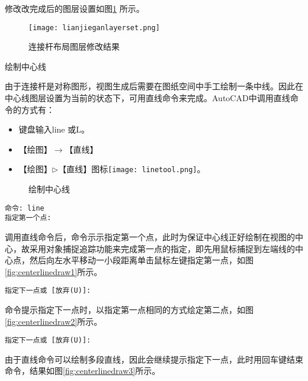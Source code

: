 \begin{procedure}
修改改完成后的图层设置如图\ref{fig:lianjieganlayerset} 所示。
\begin{figure}[htbp]
\centering
\texttt{[image: lianjieganlayerset.png]}
\caption{连接杆布局图层修改结果}\label{fig:lianjieganlayerset}
\end{figure}
\item 绘制中心线

由于连接杆是对称图形，视图生成后需要在图纸空间中手工绘制一条中线。因此在中心线图层设置为当前的状态下，可用直线命令来完成。AutoCAD中调用直线命令的方式有：
\begin{itemize}
\item 键盘输入line 或L。
\item 【绘图】$\rightarrow$【直线】
\item 【绘图】$\triangleright$【直线】图标\texttt{[image: linetool.png]}。
\end{itemize}

\begin{figure}[htbp]
\centering
{}\hspace{20pt}
\hspace{20pt}
\caption{绘制中心线}
\end{figure}

\begin{lstlisting}
命令: line
指定第一个点:
\end{lstlisting}

调用直线命令后，命令示示指定第一个点，此时为保证中心线正好绘制在视图的中心，故采用对象捕捉追踪功能来完成第一点的指定，即先用鼠标捕捉到左端线的中心点，然后向左水平移动一小段距离单击鼠标左键指定第一点，如图\ref{fig:centerlinedraw1}所示。
\begin{lstlisting}
指定下一点或 [放弃(U)]:
\end{lstlisting}

命令提示指定下一点时，以指定第一点相同的方式绘定第二点，如图\ref{fig:centerlinedraw2}所示。
\begin{lstlisting}
指定下一点或 [放弃(U)]:
\end{lstlisting}

由于直线命令可以绘制多段直线，因此会继续提示指定下一点，此时用回车键结束命令，结果如图\ref{fig:centerlinedraw3}所示。
\end{procedure}
